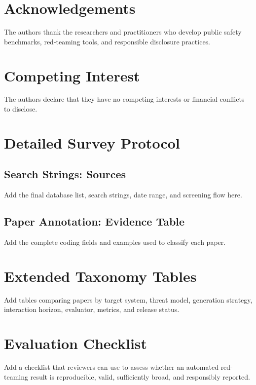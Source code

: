 \documentclass[review]{fcs}
\begin{document}
\section*{Acknowledgements}
The authors thank the researchers and practitioners who develop public safety benchmarks, red-teaming tools, and responsible disclosure practices.

\section*{Competing Interest}
The authors declare that they have no competing interests or financial conflicts to disclose.

\appendix

\section{Detailed Survey Protocol}

\subsection{Search Strings: Sources}
Add the final database list, search strings, date range, and screening flow here.

\subsection{Paper Annotation: Evidence Table}
Add the complete coding fields and examples used to classify each paper.

\section{Extended Taxonomy Tables}

Add tables comparing papers by target system, threat model, generation strategy, interaction horizon, evaluator, metrics, and release status.

\section{Evaluation Checklist}

Add a checklist that reviewers can use to assess whether an automated red-teaming result is reproducible, valid, sufficiently broad, and responsibly reported.



\end{document}
